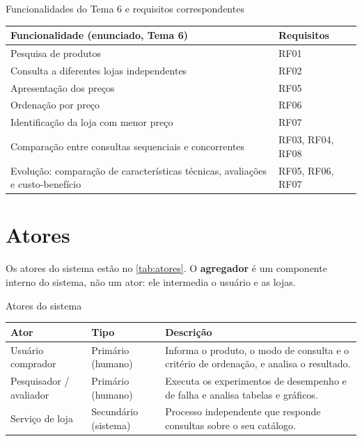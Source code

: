 \begin{quadro}[!htbp]
  \centering\small
  \caption{Funcionalidades do Tema 6 e requisitos correspondentes}\label{qua:tema6}
  \begin{tabularx}{\textwidth}{|Y|L{2.6cm}|}
    \hline
    \textbf{Funcionalidade (enunciado, Tema 6)} & \textbf{Requisitos} \\ \hline
    Pesquisa de produtos & RF01 \\ \hline
    Consulta a diferentes lojas independentes & RF02 \\ \hline
    Apresentação dos preços & RF05 \\ \hline
    Ordenação por preço & RF06 \\ \hline
    Identificação da loja com menor preço & RF07 \\ \hline
    Comparação entre consultas sequenciais e concorrentes & RF03, RF04, RF08 \\ \hline
    Evolução: comparação de características técnicas, avaliações e custo-benefício & RF05, RF06, RF07 \\ \hline
  \end{tabularx}
  \fonteautores
\end{quadro}

\chapter{Atores}

Os atores do sistema estão no \autoref{tab:atores}. O \textbf{agregador} é um componente interno do sistema, não um ator: ele intermedia o usuário e as lojas.

\begin{quadro}[!htbp]
  \centering\small
  \caption{Atores do sistema}\label{tab:atores}
  \begin{tabularx}{\textwidth}{|L{3.6cm}|L{3.4cm}|Y|}
    \hline
    \textbf{Ator} & \textbf{Tipo} & \textbf{Descrição} \\ \hline
    Usuário comprador & Primário (humano) & Informa o produto, o modo de consulta e o critério de ordenação, e analisa o resultado. \\ \hline
    Pesquisador / avaliador & Primário (humano) & Executa os experimentos de desempenho e de falha e analisa tabelas e gráficos. \\ \hline
    Serviço de loja & Secundário (sistema) & Processo independente que responde consultas sobre o seu catálogo. \\ \hline  \end{tabularx}
  \fonteautores
\end{quadro}

